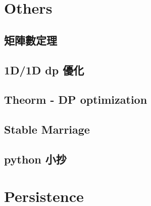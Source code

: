 \section{Others}

\subsection{矩陣數定理}

\subsection{1D/1D dp 優化}

\subsection{Theorm - DP optimization}

\subsection{Stable Marriage}

\subsection{python 小抄}



\section{Persistence}

